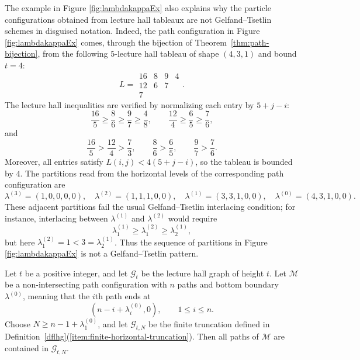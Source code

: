 \documentclass[11pt]{amsart}
\theoremstyle{plain}
\numberwithin{equation}{section}
\numberwithin{theorem}{section}
\numberwithin{figure}{section}
\begin{document}
The example in Figure \ref{fig:lambdakappaEx} also explains why the particle configurations
obtained from lecture hall tableaux are not Gelfand--Tsetlin schemes in disguised notation.
Indeed, the path configuration in Figure \ref{fig:lambdakappaEx} comes, through the
bijection of Theorem~\ref{thm:path-bijection}, from the following $5$-lecture hall tableau of shape
$(4,3,1)$ and bound $t=4$:
\[
L=
\begin{array}{cccc}
16 & 8 & 9 & 4\\
12 & 6 & 7\\
7
\end{array}.
\]
The lecture hall inequalities are verified by normalizing each entry by $5+j-i$:
\[
\frac{16}{5}\ge \frac{8}{6}\ge \frac{9}{7}\ge \frac{4}{8},
\qquad
\frac{12}{4}\ge \frac{6}{5}\ge \frac{7}{6},
\]
and
\[
\frac{16}{5}>\frac{12}{4}>\frac{7}{3},\qquad
\frac{8}{6}>\frac{6}{5},\qquad
\frac{9}{7}>\frac{7}{6}.
\]
Moreover, all entries satisfy $L(i,j)<4(5+j-i)$, so the tableau is bounded by $4$.
The partitions read from the horizontal levels of the corresponding path configuration are
\[
\lambda^{(3)}=(1,0,0,0,0),\quad
\lambda^{(2)}=(1,1,1,0,0),\quad
\lambda^{(1)}=(3,3,1,0,0),\quad
\lambda^{(0)}=(4,3,1,0,0).
\]
These adjacent partitions fail the usual Gelfand--Tsetlin interlacing condition; for instance,
interlacing between $\lambda^{(1)}$ and $\lambda^{(2)}$ would require
\[
\lambda^{(1)}_1\ge \lambda^{(2)}_1\ge \lambda^{(1)}_2,
\]
but here $\lambda^{(2)}_1=1<3=\lambda^{(1)}_2$. Thus the sequence of partitions in
Figure \ref{fig:lambdakappaEx} is not a Gelfand--Tsetlin pattern.



Let \(t\) be a positive integer, and let \(\mathcal G_t\) be the lecture hall
graph of height \(t\). Let \(\mathcal M\) be a non-intersecting path configuration
with \(n\) paths and bottom boundary \(\lambda^{(0)}\), meaning that the \(i\)th
path ends at
\[
    (n-i+\lambda^{(0)}_i,0), \qquad 1\le i\le n .
\]
Choose \(N\ge n-1+\lambda^{(0)}_1\), and let \(\mathcal G_{t,N}\) be the
{finite truncation defined in
Definition~\ref{dflhg}(\ref{item:finite-horizontal-truncation})}. Then all paths
of \(\mathcal M\) are contained in
\(\mathcal G_{t,N}\).
\end{document}
